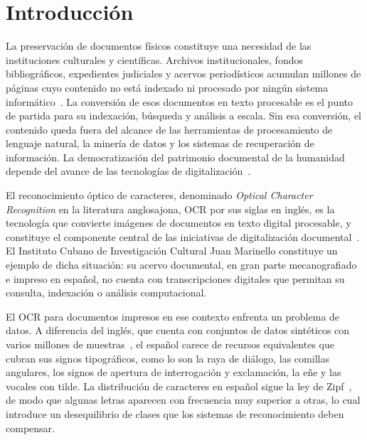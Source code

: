 \chapter*{Introducción}\label{chap:intro}

La preservación de documentos físicos constituye una necesidad de las instituciones culturales y científicas. Archivos institucionales, fondos bibliográficos, expedientes judiciales y acervos periodísticos acumulan millones de páginas cuyo contenido no está indexado ni procesado por ningún sistema informático~\cite{muehlberger2019transkribus}. La conversión de esos documentos en texto procesable es el punto de partida para su indexación, búsqueda y análisis a escala. Sin esa conversión, el contenido queda fuera del alcance de las herramientas de procesamiento de lenguaje natural, la minería de datos y los sistemas de recuperación de información. La democratización del patrimonio documental de la humanidad depende del avance de las tecnologías de digitalización~\cite{unesco2003charter}.

El reconocimiento óptico de caracteres, denominado \textit{Optical Character Recognition} en la literatura anglosajona, OCR por sus siglas en inglés, es la tecnología que convierte imágenes de documentos en texto digital procesable, y constituye el componente central de las iniciativas de digitalización documental~\cite{subramani2021survey}. El Instituto Cubano de Investigación Cultural Juan Marinello constituye un ejemplo de dicha situación: su acervo documental, en gran parte mecanografiado e impreso en español, no cuenta con transcripciones digitales que permitan su consulta, indexación o análisis computacional.

El OCR para documentos impresos en ese contexto enfrenta un problema de datos. A diferencia del inglés, que cuenta con conjuntos de datos sintéticos con varios millones de muestras~\cite{jaderberg2014synthetic}, el español carece de recursos equivalentes que cubran sus signos tipográficos, como lo son la raya de diálogo, las comillas angulares, los signos de apertura de interrogación y exclamación, la eñe y las vocales con tilde. La distribución de caracteres en español sigue la ley de Zipf~\cite{zipf1949human}, de modo que algunas letras aparecen con frecuencia muy superior a otras, lo cual introduce un desequilibrio de clases que los sistemas de reconocimiento deben compensar.

